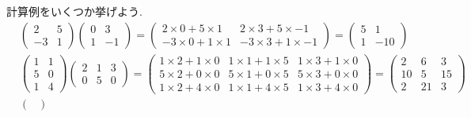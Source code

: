 \documentclass[a4j,dvipdfmx]{jsarticle}
\numberwithin{equation}{section}
\begin{document}
            計算例をいくつか挙げよう.
            \begin{align*}
                &\begin{pmatrix}
                    2  & 5 \\
                    -3 & 1
                \end{pmatrix}
                \begin{pmatrix}
                    0 &  3 \\
                    1 & -1
                \end{pmatrix}=\begin{pmatrix}
                    2\times 0 +5\times 1 & 2\times 3 + 5\times -1\\
                    -3\times 0 + 1\times 1 & -3\times 3+1\times -1
                \end{pmatrix}
                =\begin{pmatrix}
                    5 & 1\\
                    1 & -10
                \end{pmatrix}\\
                &\begin{pmatrix}
                    1 & 1 \\
                    5 & 0 \\
                    1 & 4
                \end{pmatrix}
                \begin{pmatrix}
                    2 & 1 & 3 \\
                    0 & 5 & 0
                \end{pmatrix}=\begin{pmatrix}
                    1\times 2 +1\times 0 & 1\times 1 + 1\times 5 & 1\times 3 + 1\times 0\\
                    5\times 2 + 0\times 0 & 5\times 1+0\times 5 & 5\times 3 + 0\times 0\\
                    1\times 2 + 4\times 0 & 1\times 1+4\times 5 & 1\times 3 + 4\times 0
                \end{pmatrix}
                =\begin{pmatrix}
                    2 & 6 & 3\\
                    10 & 5 & 15\\
                    2 & 21 & 3
                \end{pmatrix}\\
                &\begin{pmatrix}

\end{pmatrix}
\end{align*}
\end{document}
